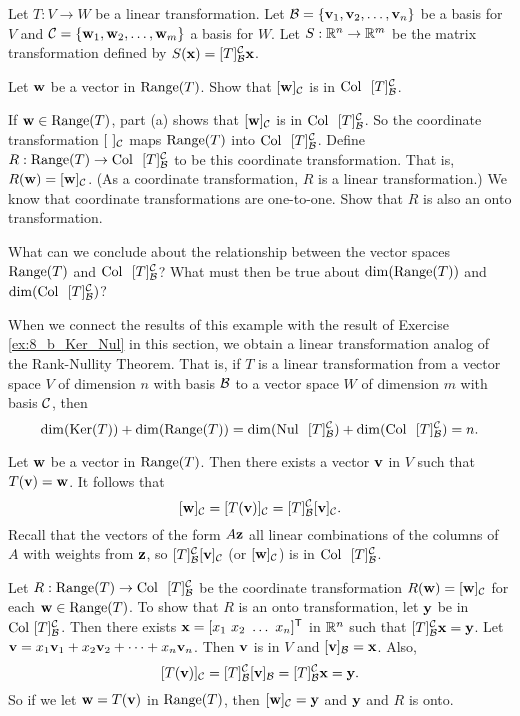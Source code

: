 \begin{example} Let $T: V \to W$ be a linear transformation. Let $\mathcal{B} = \{\mathbf{v}_1, \mathbf{v}_2, \ldots, \mathbf{v}_n\}$ be a basis for $V$ and $\mathcal{C} = \{\mathbf{w}_1, \mathbf{w}_2, \ldots, \mathbf{w}_m\}$ a basis for $W$. Let $S: \mathbb{R}^n \to \mathbb{R}^m$ be the matrix transformation defined by $S(\mathbf{x}) = [T]_{\mathcal{B}}^{\mathcal{C}} \mathbf{x}$. 
\ba
\item Let $\mathbf{w}$ be a vector in $\text{Range}(T)$. Show that $[\mathbf{w}]_{\mathcal{C}}$ is in $\text{Col } \ [T]_{\mathcal{B}}^{\mathcal{C}}$. 

\item If $\mathbf{w} \in \text{Range}(T)$, part (a) shows that $[\mathbf{w}]_{\mathcal{C}}$ is in $\text{Col } \ [T]_{\mathcal{B}}^{\mathcal{C}}$.  So the coordinate transformation $[ \ ]_{\mathcal{C}}$ maps $\text{Range}(T)$ into $\text{Col } \ [T]_{\mathcal{B}}^{\mathcal{C}}$. Define $R: \Range(T) \to \Col \ [T]_{\CB}^{\CC}$ to be this coordinate transformation. That is, $R(\mathbf{w}) = [\mathbf{w}]_{\mathcal{C}}$. (As a coordinate transformation, $R$ is a linear transformation.) We know that coordinate transformations are one-to-one. Show that $R$ is also an onto transformation. 

\item What can we conclude about the relationship between the vector spaces $\text{Range}(T)$ and $\text{Col } \ [T]_{\mathcal{B}}^{\mathcal{C}}$? What must then be true about $\dim(\text{Range}(T))$ and $\dim(\text{Col } \ [T]_{\mathcal{B}}^{\mathcal{C}})$? 

\ea

When we connect the results of this example with the result of Exercise \ref{ex:8_b_Ker_Nul} in this section, we obtain a linear transformation analog of the Rank-Nullity Theorem. That is,  if $T$ is a linear transformation from a vector space $V$ of dimension $n$ with basis $\mathcal{B}$  to a vector space $W$ of dimension $m$ with basis $\mathcal{C}$, then
\[\dim(\Ker(T)) + \dim(\Range(T)) = \dim(\Nul \ [T]_{\CB}^{\CC}) + \dim(\Col \ [T]_{\CB}^{\CC}) = n.\]

\ExampleSolution

\ba
\item Let $\mathbf{w}$ be a vector in $\text{Range}(T)$. Then there exists a vector $\mathbf{v}$ in $V$ such that $T(\mathbf{v}) = \mathbf{w}$. It follows that 
\[[\mathbf{w}]_{\mathcal{C}} = [T(\mathbf{v})]_{\mathcal{C}} = [T]_{\mathcal{B}}^{\mathcal{C}} [\mathbf{v}]_{\mathcal{C}}.\]
Recall that the vectors of the form $A \mathbf{z}$ all linear combinations of the columns of $A$ with weights from $\mathbf{z}$, so  $[T]_{\mathcal{B}}^{\mathcal{C}} [\mathbf{v}]_{\mathcal{C}}$ (or $[\mathbf{w}]_{\mathcal{C}}$) is in $\text{Col } \ [T]_{\mathcal{B}}^{\mathcal{C}}$. 

 \item Let $R: \Range(T) \to \Col \ [T]_{\CB}^{\CC}$ be the coordinate transformation $R(\mathbf{w}) = [\mathbf{w}]_{\mathcal{C}}$ for each $\mathbf{w} \in \text{Range}(T)$. 
To show that $R$ is an onto transformation, let $\mathbf{y}$ be in $\text{Col } [T]_{\mathcal{B}}^{\mathcal{C}}$. Then there exists $\vx = [x_1 \ x_2 \ \ldots \ x_n]^{\tr}$ in $\mathbb{R}^n$ such that $[T]_{\mathcal{B}}^{\mathcal{C}}\mathbf{x}=\mathbf{y}$. Let $\mathbf{v} = x_1\mathbf{v}_1 + x_2 \mathbf{v}_2 + \cdots + x_n \mathbf{v}_n$. Then $\mathbf{v}$ is in $V$ and $[\mathbf{v}]_{\mathcal{B}} = \mathbf{x}$. Also,
\[[T(\mathbf{v})]_{\mathcal{C}} = [T]_{\mathcal{B}}^{\mathcal{C}} [\mathbf{v}]_{\mathcal{B}} = [T]_{\mathcal{B}}^{\mathcal{C}} \mathbf{x} = \mathbf{y}.\]
So if we let $\mathbf{w}=T(\mathbf{v})$ in $\text{Range}(T)$, then $[\mathbf{w}]_{\mathcal{C}} = \mathbf{y}$ and $\mathbf{y}$ and $R$ is onto. 
 

\end{example}

